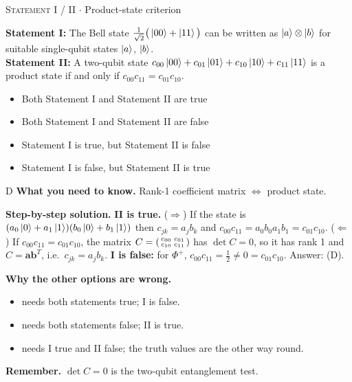\documentclass[11pt,a4paper]{article}
\newcommand{\optlabel}[1]{\textbf{(#1)}}
\newcommand{\correctlabel}[1]{\textcolor{okgreen}{\textbf{(#1)}\,\ding{51}}}
\newenvironment{qitem}[1]{\begin{list}{}{\setlength{\leftmargin}{3.3em}\setlength{\labelwidth}{3.1em}%
  \setlength{\labelsep}{0.2em}\setlength{\topsep}{3pt}\setlength{\parsep}{3pt}}\item[\textbf{Q.#1}\hfill]}{\end{list}}
\newcommand{\qsep}{\par\vspace{2pt}{\color{black!15}\hrule}\vspace{4pt}}
\newcommand{\qmeta}[2]{{\footnotesize\color{black!60}\textsc{#1} \;$\cdot$\; #2}\par}
\begin{document}
\begin{qitem}{38}
\qmeta{Statement I / II}{Product-state criterion}
\textbf{Statement I:} The Bell state $\frac{1}{\sqrt2}\big(\ket{00} + \ket{11}\big)$ can be written as $\ket{a}\otimes\ket{b}$ for
suitable single-qubit states $\ket a$, $\ket b$.\\[1mm]
\textbf{Statement II:} A two-qubit state $c_{00}\ket{00} + c_{01}\ket{01} + c_{10}\ket{10} + c_{11}\ket{11}$ is a product state if and only
if $c_{00}c_{11} = c_{01}c_{10}$.
\begin{itemize}[leftmargin=2.6em, labelsep=0.4em, itemsep=2pt, topsep=3pt]
\item[\optlabel{A}] Both Statement I and Statement II are true
\item[\optlabel{B}] Both Statement I and Statement II are false
\item[\optlabel{C}] Statement I is true, but Statement II is false
\item[\correctlabel{D}] Statement I is false, but Statement II is true
\end{itemize}
\end{qitem}
\begin{solbox}{D}
\textbf{\color{brand}What you need to know.} Rank-1 coefficient matrix $\Leftrightarrow$ product state.

\textbf{\color{brand}Step-by-step solution.} \textbf{II is true.} ($\Rightarrow$) If the state is $(a_0\ket0 + a_1\ket1)(b_0\ket0 + b_1\ket1)$ then $c_{jk} = a_jb_k$ and
$c_{00}c_{11} = a_0b_0a_1b_1 = c_{01}c_{10}$. ($\Leftarrow$) If $c_{00}c_{11} = c_{01}c_{10}$, the matrix $C = \begin{psmallmatrix}c_{00}&c_{01}\\ c_{10}&c_{11}\end{psmallmatrix}$
has $\det C = 0$, so it has rank 1 and $C = \mathbf{a}\mathbf{b}^T$, i.e.\ $c_{jk} = a_jb_k$.
\textbf{I is false:} for $\Phi^+$, $c_{00}c_{11} = \frac12 \neq 0 = c_{01}c_{10}$. Answer: (D).

\textbf{\color{brand}Why the other options are wrong.}
\begin{itemize}[leftmargin=2.4em, itemsep=1pt, topsep=2pt]
\item[\textbf{(A)}] needs both statements true; I is false.
\item[\textbf{(B)}] needs both statements false; II is true.
\item[\textbf{(C)}] needs I true and II false; the truth values are the other way round.
\end{itemize}
\textbf{\color{brand}Remember.} $\det C = 0$ is the two-qubit entanglement test.
\end{solbox}
\qsep
\end{document}
